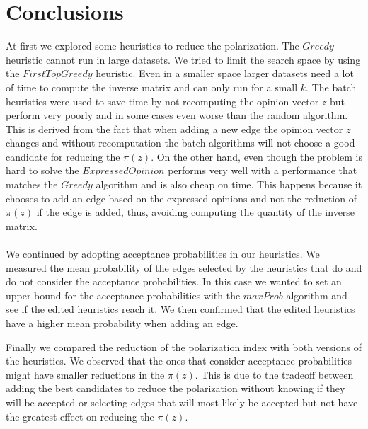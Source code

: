 \chapter{Conclusions}
\label{ch:conclusions}


At first we explored some heuristics to reduce the polarization. The $Greedy$ heuristic cannot run in large datasets. We tried to limit the search space by using the $FirstTopGreedy$ heuristic. Even in a smaller space larger datasets need a lot of time to compute the inverse matrix and can only run for a small $k$. The batch heuristics were used to save time by not recomputing the opinion vector $z$ but perform very poorly and in some cases even worse than the random algorithm. This is derived from the fact that when adding a new edge the opinion vector $z$ changes and without recomputation the batch algorithms will not choose a good candidate for reducing the $\pi(z)$. On the other hand, even though the problem is hard to solve the $ExpressedOpinion$ performs very well with a performance that matches the $Greedy$ algorithm and is also cheap on time. This happens because it chooses to add an edge based on the expressed opinions and not the reduction of $\pi(z)$ if the edge is added, thus, avoiding computing the quantity of the inverse matrix.
\\
\\
We continued by adopting acceptance probabilities in our heuristics. We measured the mean probability of the edges selected by the heuristics that do and do not consider the acceptance probabilities. In this case we wanted to set an upper bound for the acceptance probabilities with the $maxProb$ algorithm and see if the edited heuristics reach it. We then confirmed that the edited heuristics have a higher mean probability when adding an edge. 

\clearpage

\noindent Finally we compared the reduction of the polarization index with both versions of the heuristics. We observed that the ones that consider acceptance probabilities might have smaller reductions in the $\pi(z)$. This is due to the tradeoff between adding the best candidates to reduce the polarization without knowing if they will be accepted or selecting edges that will most likely be accepted but not have the greatest effect on reducing the $\pi(z)$.




